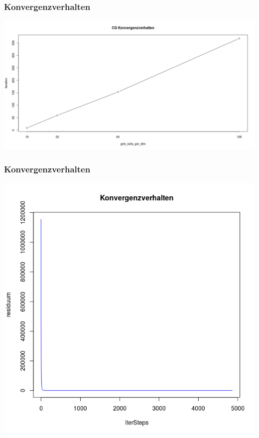 \documentclass[]{beamer}
\begin{document}
\begin{frame}
\frametitle{Konvergenzverhalten} 
\begin{center}
\includegraphics[scale=0.22]{CG_Konvergenzverhalten.png}
\end{center}
\end{frame}


\begin{frame}
\frametitle{Konvergenzverhalten}
\begin{center}
\includegraphics[scale=0.3]{Konvergenzverhalten_ganz.png}
\end{center}
\end{frame}
\end{document}
